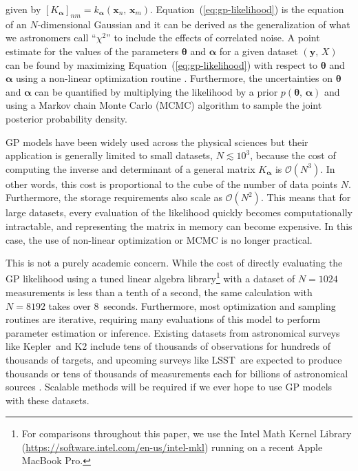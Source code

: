 \documentclass[manuscript, letterpaper]{aastex6}
\newcommand{\project}[1]{\textsf{#1}}
\newcommand{\kepler}{\project{Kepler}}
\newcommand{\lsst}{\project{LSST}}
\renewcommand{\eqref}[1]{\ref{eq:#1}}
\newcommand{\Eq}[1]{Equation~(\eqref{#1})}
\newcommand{\eq}[1]{\Eq{#1}}
\newcommand{\bvec}[1]{{\ensuremath{\boldsymbol{#1}}}}
\newcommand{\response}[1]{{\color{blue}#1}}
\begin{document}
given by $[K_\bvec{\alpha}]_{nm} = k_\bvec{\alpha}(\bvec{x}_n,\,\bvec{x}_m)$.
\eq{gp-likelihood} is the equation of an $N$-dimensional Gaussian and it can
be derived as the generalization of what we astronomers call ``$\chi^2$''
to include the effects of correlated noise.
\response{
A point estimate for the values of the parameters $\bvec{\theta}$ and
$\bvec{\alpha}$ for a given dataset $(\bvec{y},\,X)$ can be found by
maximizing \eq{gp-likelihood} with respect to $\bvec{\theta}$ and
$\bvec{\alpha}$ using a non-linear optimization routine \citep{Nocedal:2006}.}
\response{Furthermore, the uncertainties on $\bvec{\theta}$ and
$\bvec{\alpha}$ can be quantified by multiplying the likelihood by a prior
$p(\bvec{\theta},\,\bvec{\alpha})$ and using a Markov chain Monte Carlo (MCMC)
algorithm to sample the joint posterior probability density.}

GP models have been widely used across the physical sciences but their
application is generally limited to small datasets, \response{$N \lesssim
10^3$}, because the cost of computing the inverse and determinant of a general
matrix $K_\bvec{\alpha}$ is $\mathcal{O}(N^3)$.
In other words, this cost is proportional to the cube of the number of data
points $N$.
Furthermore, the storage requirements also scale as $\mathcal{O}(N^2)$.
This means that for large datasets, every evaluation of the likelihood quickly
becomes computationally intractable, and representing the matrix in memory can
become expensive.
In this case, the use of non-linear optimization or MCMC is no longer
practical.

\response{This is not a purely academic concern.
While the cost of directly evaluating the GP likelihood using a tuned linear
algebra library\footnote{For comparisons throughout this paper, we use the
Intel Math Kernel Library (\url{https://software.intel.com/en-us/intel-mkl})
running on a recent Apple MacBook Pro.} with a dataset of $N=1024$
measurements is less than a tenth of a second, the same calculation with
$N=8192$ takes over 8~seconds.
Furthermore, most optimization and sampling routines are iterative, requiring
many evaluations of this model to perform parameter estimation or inference.
Existing datasets from astronomical surveys like \kepler\ and \project{K2}
include tens of thousands of observations for hundreds of thousands of
targets, and upcoming surveys like \lsst\ are expected to produce thousands or
tens of thousands of measurements each for billions of astronomical sources
\citep{Ivezic:2008}.
Scalable methods will be required if we ever hope to use GP models with these
datasets.
}
\end{document}
